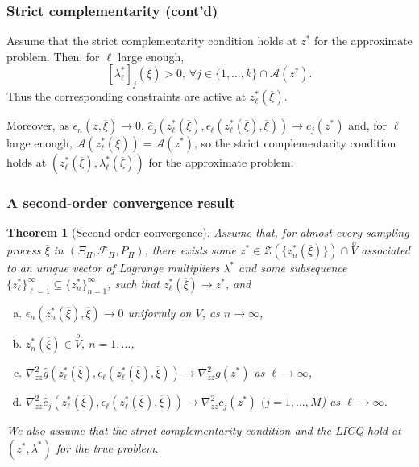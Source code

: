 \documentclass{beamer}
\newtheorem{theo}{Theorem}
\begin{document}
\begin{frame}
\frametitle{Strict complementarity (cont'd)}

Assume that the strict complementarity condition holds at $z^*$ for the approximate problem.
Then, for $\ell$ large enough,
$$
[\lambda^*_{\ell}]_j(\overline{\xi}) > 0,\, \forall j \in \lbrace 1,\ldots,k \rbrace \cap \mathcal{A} ( z^* ) .
$$
Thus the corresponding constraints are active at $z^*_{\ell}(\overline{\xi})$.

\mbox{}

Moreover, as $\epsilon_n (z, \overline{\xi} ) \rightarrow 0$,
$\hat{c}_j \left( z^*_{\ell}(\overline{\xi}),
\epsilon_{\ell}(z^*_{\ell}(\overline{\xi}),\overline{\xi}) \right) \rightarrow
c_j ( z^* )$ and, for $\ell$ large enough,
$\mathcal{A} \left( z^*_{\ell}(\overline{\xi}) \right) = \mathcal{A} (
z^* )$, so the strict complementarity condition holds at $\left(
  z^*_{\ell}(\overline{\xi}), \lambda_{\ell}^*(\overline{\xi})
\right)$ for the approximate problem.



\end{frame}

\begin{frame}
\frametitle{A second-order convergence result}

\begin{theo}[Second-order convergence]
\label{th:soc}
Assume that, for almost every sampling process $\overline{\xi}$ in $(\Xi_{\Pi}, \mathcal{F}_{\Pi}, P_{\Pi})$, there exists some $z^* \in \mathcal{Z} \left(\lbrace
  z^*_n(\overline{\xi})\rbrace\right) \cap \overset{o}{V}$ associated to an unique vector of Lagrange multipliers $\lambda^*$ and some subsequence $\lbrace z_{\ell}^* \rbrace_{\ell = 1}^{\infty} \subseteq \lbrace  z_n^* \rbrace_{n = 1}^{\infty}$, such that $z^*_{\ell}(\overline{\xi}) \rightarrow z^*$, and
\begin{enumerate}[(a)]
\item
$\epsilon_n \left( z^*_n(\overline{\xi}),\overline{\xi} \right)
  \rightarrow 0$ uniformly on $V$, as $n \rightarrow \infty$,
\item
$z^*_n(\overline{\xi}) \in \overset{o}{V}$, $n = 1,\ldots$,
\item
$\nabla^2_{zz} \hat{g} \left( z^*_{\ell}(\overline{\xi}), 
\epsilon_{\ell}(z^*_{\ell}(\overline{\xi}),\overline{\xi}) \right)
\rightarrow \nabla^2_{zz} g ( z^* )$ as $\ell \rightarrow \infty$,
\item
$\nabla^2_{zz} \hat{c}_j \left( z^*_{\ell}(\overline{\xi}), 
\epsilon_{\ell}(z^*_{\ell}(\overline{\xi}),\overline{\xi}) \right)
\rightarrow \nabla^2_{zz} c_j ( z^* )$ $(j=1,\ldots,M$) as
$\ell \rightarrow \infty$.
\end{enumerate}
We also assume that the strict complementarity condition and the LICQ hold at $( z^*, \lambda^* )$ for the true problem.
\end{theo}

\end{frame}
\end{document}

